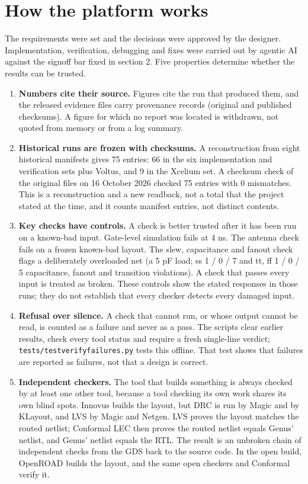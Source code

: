 \documentclass[11pt,letterpaper]{article}
\newcommand{\sk}[1]{\texttt{#1}}
\renewcommand{\_}{\textunderscore\penalty0\hskip0pt\relax}
\begin{document}
\section{How the platform works}
The requirements were set and the decisions were approved by the designer. Implementation, verification, debugging and fixes were carried out by agentic AI against the signoff bar fixed in section 2. Five properties determine whether the results can be trusted.
\begin{enumerate}
\item \textbf{Numbers cite their source.} Figures cite the run that produced them, and the released evidence files carry provenance records (original and published checksums). A figure for which no report was located is withdrawn, not quoted from memory or from a log summary.
\item \textbf{Historical runs are frozen with checksums.} A reconstruction from eight historical manifests gives 75 entries: 66 in the six implementation and verification sets plus Voltus, and 9 in the Xcelium set. A checksum check of the original files on 16 October 2026 checked 75 entries with 0 mismatches. This is a reconstruction and a new readback, not a total that the project stated at the time, and it counts manifest entries, not distinct contents.
\item \textbf{Key checks have controls.} A check is better trusted after it has been run on a known-bad input. Gate-level simulation fails at 4 ns. The antenna check fails on a frozen known-bad layout. The slew, capacitance and fanout check flags a deliberately overloaded net (a 5 pF load; ss 1 / 0 / 7 and tt, ff 1 / 0 / 5 capacitance, fanout and transition violations). A check that passes every input is treated as broken. These controls show the stated responses in those runs; they do not establish that every checker detects every damaged input.
\item \textbf{Refusal over silence.} A check that cannot run, or whose output cannot be read, is counted as a failure and never as a pass. The scripts clear earlier results, check every tool status and require a fresh single-line verdict; \sk{tests/test\_verify\_failures.py} tests this offline. That test shows that failures are reported as failures, not that a design is correct.
\item \textbf{Independent checkers.} The tool that builds something is always checked by at least one other tool, because a tool checking its own work shares its own blind spots. Innovus builds the layout, but DRC is run by Magic and by KLayout, and LVS by Magic and Netgen. LVS proves the layout matches the routed netlist; Conformal LEC then proves the routed netlist equals Genus' netlist, and Genus' netlist equals the RTL. The result is an unbroken chain of independent checks from the GDS back to the source code. In the open build, OpenROAD builds the layout, and the same open checkers and Conformal verify it.
\end{enumerate}
\end{document}
